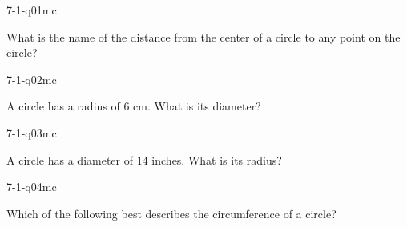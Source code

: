 

\begin{practiceQuestion}{7-1-q01}{mc}
\begin{questionText}
What is the name of the distance from the center of a circle to any point on the circle?
\end{questionText}
\end{practiceQuestion}

\begin{practiceQuestion}{7-1-q02}{mc}
\begin{questionText}
A circle has a radius of $6$ cm. What is its diameter?
\end{questionText}
\end{practiceQuestion}

\begin{practiceQuestion}{7-1-q03}{mc}
\begin{questionText}
A circle has a diameter of $14$ inches. What is its radius?
\end{questionText}
\end{practiceQuestion}

\begin{practiceQuestion}{7-1-q04}{mc}
\begin{questionText}
Which of the following best describes the circumference of a circle?
\end{questionText}
\end{practiceQuestion}

